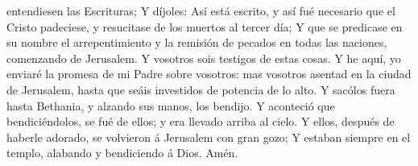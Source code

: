 entendiesen las Escrituras;  Y díjoles: Así está escrito, y
así fué necesario que el Cristo padeciese, y resucitase de los muertos
al tercer día;  Y que se predicase en su nombre el
arrepentimiento y la remisión de pecados en todas las naciones,
comenzando de Jerusalem.  Y vosotros sois testigos de estas
cosas.  Y he aquí, yo enviaré la promesa de mi Padre sobre
vosotros: mas vosotros asentad en la ciudad de Jerusalem, hasta que
seáis investidos de potencia de lo alto.  Y sacólos fuera
hasta Bethania, y alzando sus manos, los bendijo.  Y
aconteció que bendiciéndolos, se fué de ellos; y era llevado arriba al
cielo.  Y ellos, después de haberle adorado, se volvieron á
Jerusalem con gran gozo;  Y estaban siempre en el templo,
alabando y bendiciendo á Dios. Amén.
